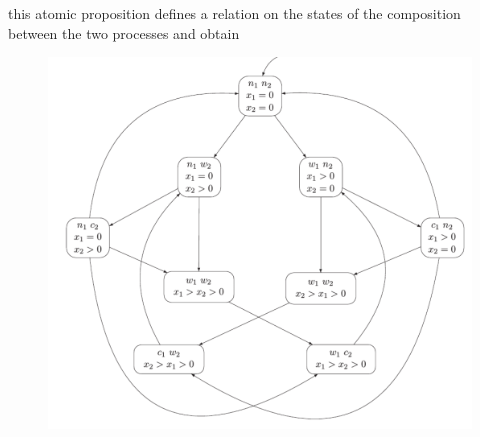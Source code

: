 \documentclass{article}
\begin{document}
				this atomic proposition defines a relation on the states of the composition between the two processes and obtain
				\begin{figure}[H]
					\centering
					\includegraphics[width = \textwidth]{./images/bakery2.png}
				\end{figure}
				
			
			
			
		
		
		
		
		
		
		
		
		
\end{document}
